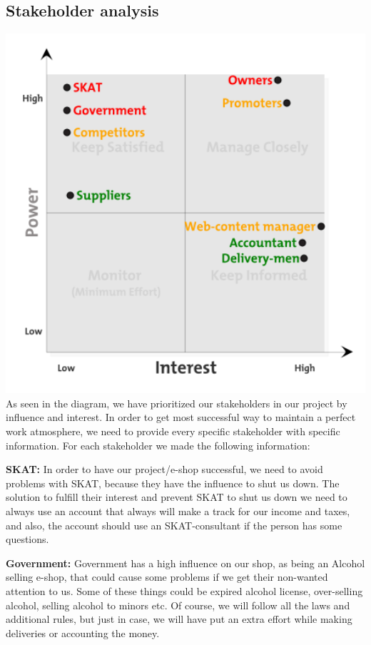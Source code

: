 \documentclass[12p]{article}
\begin{document}
\newpage


\subsection{Stakeholder analysis} \label{StakeholderAnalysis}

\includegraphics[width=1\textwidth]{stakeholder}\\
As seen in the diagram, we have prioritized our stakeholders in our project by influence and interest. In order to get most successful way to maintain a perfect work atmosphere, we need to provide every specific stakeholder with specific information. For each stakeholder we made the following information: 

\textbf{SKAT:}
In order to have our project/e-shop successful, we need to avoid problems with SKAT, because they have the influence to shut us down. The solution to fulfill their interest and prevent SKAT to shut us down we need to always use an account that always will make a track for our income and taxes, and also, the account should use an SKAT-consultant if the person has some questions.

\textbf{Government:}
Government has a high influence on our shop, as being an Alcohol selling e-shop, that could cause some problems if we get their non-wanted attention to us. Some of these things could be expired alcohol license, over-selling alcohol, selling alcohol to minors etc. Of course, we will follow all the laws and additional rules, but just in case, we will have put an extra effort while making deliveries or accounting the money.
\end{document}
